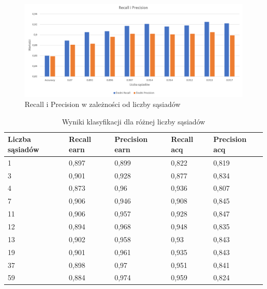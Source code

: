 \documentclass{classrep}
\begin{document}
{\begin{figure}[H]
\caption{Recall i Precision w zależności od liczby sąsiadów}
\centering
\includegraphics[width=1\textwidth]{i8}
\end{figure}

\begin{table}[H]
\begin{center}
\caption{Wyniki klasyfikacji dla różnej liczby sąsiadów}
\begin{tabular}{|l|l|l|l|l|}
\hline
\textbf{Liczba sąsiadów} & \textbf{Recall earn} & \textbf{Precision earn} & \textbf{Recall acq} & \textbf{Precision acq} \\ \hline
1                        & 0,897                & 0,899                   & 0,822               & 0,819                  \\ \hline
3                        & 0,901                & 0,928                   & 0,877               & 0,834                  \\ \hline
4                        & 0,873                & 0,96                    & 0,936               & 0,807                  \\ \hline
7                        & 0,906                & 0,946                   & 0,908               & 0,845                  \\ \hline
11                       & 0,906                & 0,957                   & 0,928               & 0,847                  \\ \hline
12                       & 0,894                & 0,968                   & 0,948               & 0,835                  \\ \hline
13                       & 0,902                & 0,958                   & 0,93                & 0,843                  \\ \hline
19                       & 0,901                & 0,961                   & 0,935               & 0,843                  \\ \hline
37                       & 0,898                & 0,97                    & 0,951               & 0,841                  \\ \hline
59                       & 0,884                & 0,974                   & 0,959               & 0,824                  \\ \hline
\end{tabular}
\end{center}
\end{table}

}
\end{document}
